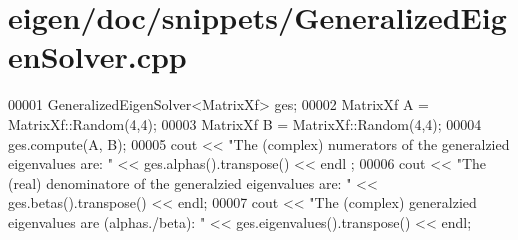 \hypertarget{eigen_2doc_2snippets_2_generalized_eigen_solver_8cpp_source}{}\section{eigen/doc/snippets/\+Generalized\+Eigen\+Solver.cpp}
\label{eigen_2doc_2snippets_2_generalized_eigen_solver_8cpp_source}

\begin{DoxyCode}
00001 GeneralizedEigenSolver<MatrixXf> ges;
00002 MatrixXf A = MatrixXf::Random(4,4);
00003 MatrixXf B = MatrixXf::Random(4,4);
00004 ges.compute(A, B);
00005 cout << \textcolor{stringliteral}{"The (complex) numerators of the generalzied eigenvalues are: "} << ges.alphas().transpose() << endl
      ;
00006 cout << \textcolor{stringliteral}{"The (real) denominatore of the generalzied eigenvalues are: "} << ges.betas().transpose() << endl;
00007 cout << \textcolor{stringliteral}{"The (complex) generalzied eigenvalues are (alphas./beta): "} << ges.eigenvalues().transpose() << 
      endl;
\end{DoxyCode}
